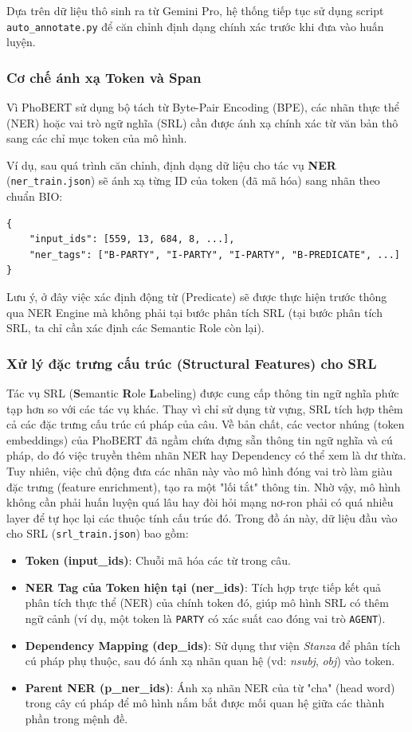 Dựa trên dữ liệu thô sinh ra từ Gemini Pro, hệ thống tiếp tục sử dụng script \texttt{auto\_annotate.py} để căn chỉnh định dạng chính xác trước khi đưa vào huấn luyện. 

\subsubsection{Cơ chế ánh xạ Token và Span}
Vì PhoBERT sử dụng bộ tách từ Byte-Pair Encoding (BPE), các nhãn thực thể (NER) hoặc vai trò ngữ nghĩa (SRL) cần được ánh xạ chính xác từ văn bản thô sang các chỉ mục token của mô hình. 

Ví dụ, sau quá trình căn chỉnh, định dạng dữ liệu cho tác vụ \textbf{NER} (\texttt{ner\_train.json}) sẽ ánh xạ từng ID của token (đã mã hóa) sang nhãn theo chuẩn BIO:
\begin{verbatim}
{
    "input_ids": [559, 13, 684, 8, ...],
    "ner_tags": ["B-PARTY", "I-PARTY", "I-PARTY", "B-PREDICATE", ...]
}
\end{verbatim}

Lưu ý, ở đây việc xác định động từ (Predicate) sẽ được thực hiện trước thông qua NER Engine mà không phải tại bước phân tích SRL (tại bước phân tích SRL, ta chỉ cần xác định các Semantic Role còn lại).

\subsubsection{Xử lý đặc trưng cấu trúc (Structural Features) cho SRL}
Tác vụ SRL (\textbf{S}emantic \textbf{R}ole \textbf{L}abeling) được cung cấp thông tin ngữ nghĩa phức tạp hơn so với các tác vụ khác. Thay vì chỉ sử dụng từ vựng, SRL tích hợp thêm cả các đặc trưng cấu trúc cú pháp của câu. Về bản chất, các vector nhúng (token embeddings) của PhoBERT đã ngầm chứa đựng sẵn thông tin ngữ nghĩa và cú pháp, do đó việc truyền thêm nhãn NER hay Dependency có thể xem là dư thừa. Tuy nhiên, việc chủ động đưa các nhãn này vào mô hình đóng vai trò làm giàu đặc trưng (feature enrichment), tạo ra một "lối tắt" thông tin. Nhờ vậy, mô hình không cần phải huấn luyện quá lâu hay đòi hỏi mạng nơ-ron phải có quá nhiều layer để tự học lại các thuộc tính cấu trúc đó. Trong đồ án này, dữ liệu đầu vào cho SRL (\texttt{srl\_train.json}) bao gồm:
\begin{itemize}
    \item \textbf{Token (input\_ids)}: Chuỗi mã hóa các từ trong câu.
    \item \textbf{NER Tag của Token hiện tại (ner\_ids)}: Tích hợp trực tiếp kết quả phân tích thực thể (NER) của chính token đó, giúp mô hình SRL có thêm ngữ cảnh (ví dụ, một token là \texttt{PARTY} có xác suất cao đóng vai trò \texttt{AGENT}).
    \item \textbf{Dependency Mapping (dep\_ids)}: Sử dụng thư viện \textit{Stanza} để phân tích cú pháp phụ thuộc, sau đó ánh xạ nhãn quan hệ (vd: \textit{nsubj}, \textit{obj}) vào token.
    \item \textbf{Parent NER (p\_ner\_ids)}: Ánh xạ nhãn NER của từ "cha" (head word) trong cây cú pháp để mô hình nắm bắt được mối quan hệ giữa các thành phần trong mệnh đề.
\end{itemize}

